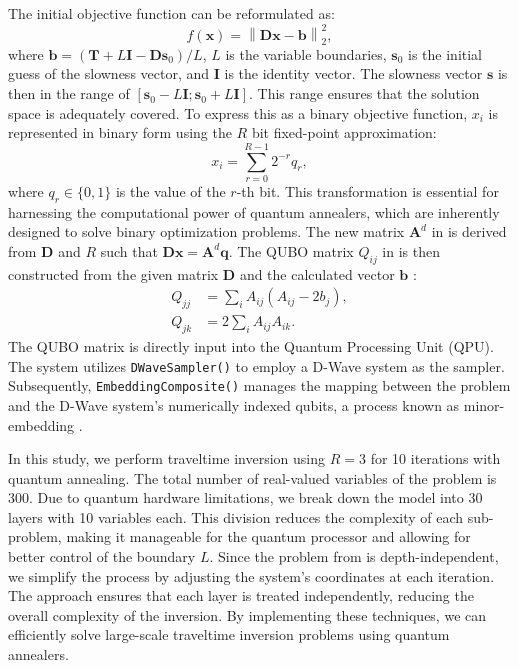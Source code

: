 The initial objective function  can be reformulated as:
\begin{equation}
f(\mathbf{x}) = \left\| \mathbf{D} \mathbf{x} - \mathbf{b} \right\|^2_2,
\end{equation}
where $\mathbf{b} = \left(\mathbf{T} + L \mathbf{I} - \mathbf{D} \mathbf{s}_0 \right) / L$, $L$ is the variable boundaries, $\mathbf{s}_0$ is the initial guess of the slowness vector, and $\mathbf{I}$ is the identity vector. The slowness vector $\mathbf{s}$ is then in the range of $[\mathbf{s}_0 - L \mathbf{I}; \mathbf{s}_0 + L \mathbf{I}]$. This range ensures that the solution space is adequately covered. To express this as a binary objective function, $x_i$ is represented in binary form using the $R$ bit fixed-point approximation:
\begin{equation}
x_i = \sum_{r=0}^{R-1} 2^{-r} q_r,
\label{eq:ch3-fixed-point}
\end{equation}
where $q_r \in \{0, 1\}$ is the value of the $r$-th bit. This transformation is essential for harnessing the computational power of quantum annealers, which are inherently designed to solve binary optimization problems. The new matrix $\mathbf{A}^d$ in  is derived from $\mathbf{D}$ and $R$ such that $\mathbf{D} \mathbf{x} = \mathbf{A}^d \mathbf{q}$. The QUBO matrix $Q_{ij}$ in  is then constructed from the given matrix $\mathbf{D}$ and the calculated vector $\mathbf{b}$ \cite{Omalley16,borle19}:
\begin{align}
Q_{jj} &= \sum_i A_{ij} (A_{ij} - 2b_j) , \\
Q_{jk} &= 2 \sum_i A_{ij} A_{ik} .
\end{align}
The QUBO matrix is directly input into the Quantum Processing Unit (QPU). The system utilizes \texttt{DWaveSampler()} to employ a D-Wave system as the sampler. Subsequently, \texttt{EmbeddingComposite()} manages the mapping between the problem and the D-Wave system's numerically indexed qubits, a process known as minor-embedding \cite{dwave23}.

In this study, we perform traveltime inversion using \(R=3\) for 10 iterations with quantum annealing. The total number of real-valued variables of the problem is 300. Due to quantum hardware limitations, we break down the model into 30 layers with 10 variables each. This division reduces the complexity of each sub-problem, making it manageable for the quantum processor and allowing for better control of the boundary \(L\). Since the problem from  is depth-independent, we simplify the process by adjusting the system's coordinates at each iteration. The approach ensures that each layer is treated independently, reducing the overall complexity of the inversion. By implementing these techniques, we can efficiently solve large-scale traveltime inversion problems using quantum annealers.

